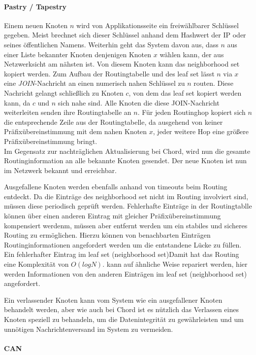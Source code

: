 \paragraph{Pastry / Tapestry}
Einem neuen Knoten $n$ wird von Applikationsseite ein freiwählbarer Schlüssel gegeben. Meist brechnet sich dieser Schlüssel anhand dem Hashwert der IP oder seines öffentlichen Namens. Weiterhin geht das System davon aus, dass $n$ aus einer Liste bekannter Knoten denjenigen Knoten $x$ wählen kann, der aus Netzwerksicht am nähsten ist. Von diesem Knoten kann das neighborhood set kopiert werden. Zum Aufbau der Routingtabelle und des leaf set lässt $n$ via $x$ eine \emph{JOIN}-Nachricht an einen numerisch nahen Schlüssel zu $n$ routen. Diese Nachricht gelangt schließlich zu Knoten $c$, von dem das leaf set kopiert werden kann, da $c$ und $n$ sich nahe sind. Alle Knoten die diese JOIN-Nachricht weiterleiten senden ihre Routingtabelle an $n$. Für jeden Routinghop kopiert sich $n$ die entsprechende Zeile aus der Routingtabelle, da ausgehend von keiner Präfixübereinstimmung mit dem nahen Knoten $x$, jeder weitere Hop eine größere Präfixübereinstimmung bringt.\\
Im Gegensatz zur nachträglichen Aktualisierung bei Chord, wird nun die gesamte Routinginformation an alle bekannte Knoten gesendet. Der neue Knoten ist nun im Netzwerk bekannt und erreichbar.

Ausgefallene Knoten werden ebenfalls anhand von timeouts beim Routing entdeckt. Da die Einträge des neighborhood set nicht im Routing involviert sind, müssen diese periodisch geprüft werden. Fehlerhafte Einträge in der Routingtablle können über einen anderen Eintrag mit gleicher Präfixübereinstimmung kompensiert werdenm, müssen aber entfernt werden um ein stabiles und sicheres Routing zu ermöglichen. Hierzu können von benachbarten Einträgen Routinginformationen angefordert werden um die entstandene Lücke zu füllen. Ein fehlerhafter Eintrag im leaf set (neighborhood set)Damit hat das Routing eine Komplexität von $O(log N)$. kann auf ähnliche Weise repariert werden, hier werden Informationen von den anderen Einträgen im leaf set  (neighborhood set) angefordert.

Ein verlassender Knoten kann vom System wie ein ausgefallener Knoten behandelt werden, aber wie auch bei Chord ist es nützlich das Verlassen eines Knoten speziell zu behandeln, um die Datenintegrität zu gewährleisten und um unnötigen Nachrichtenversand im System zu vermeiden.

\paragraph{CAN}

